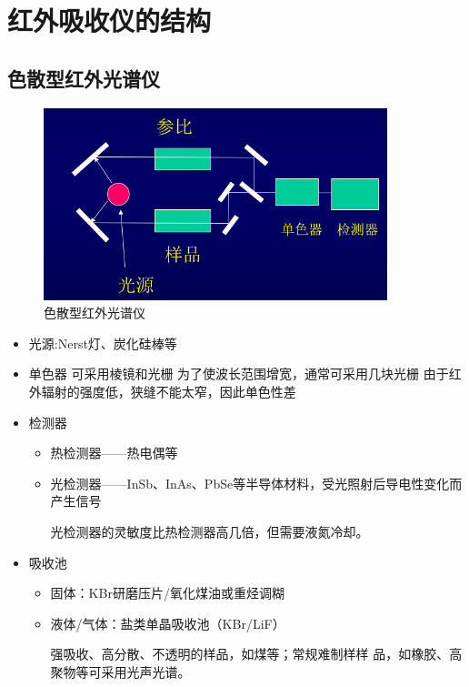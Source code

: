 \section{红外吸收仪的结构}
\subsection{色散型红外光谱仪}
\begin{figure}[ht]
    \centering
    \includegraphics[width=10cm]{image/chp5_ord_ins.png}
    \caption{色散型红外光谱仪}
    \label{fig:ordin_ins}
\end{figure}
\begin{itemize}
    \item 光源:Nerst灯、炭化硅棒等
    \item 单色器
可采用棱镜和光栅
为了使波长范围增宽，通常可采用几块光栅
由于红外辐射的强度低，狭缝不能太窄，因此单色性差
    \item 检测器
    \begin{itemize}
        \item 热检测器——热电偶等
        \item 光检测器——InSb、InAs、PbSe等半导体材料，受光照射后导电性变化而产生信号
        \begin{note}
            光检测器的灵敏度比热检测器高几倍，但需要液氮冷却。
        \end{note}
    \end{itemize}
    \item  吸收池
    \begin{itemize}
        \item 固体：KBr研磨压片/氧化煤油或重烃调糊
        \item 液体/气体：盐类单晶吸收池（KBr/LiF）
        \begin{note}
强吸收、高分散、不透明的样品，如煤等；常规难制样样
品，如橡胶、高聚物等可采用光声光谱。
        \end{note}
    \end{itemize}

		   
\end{itemize}
